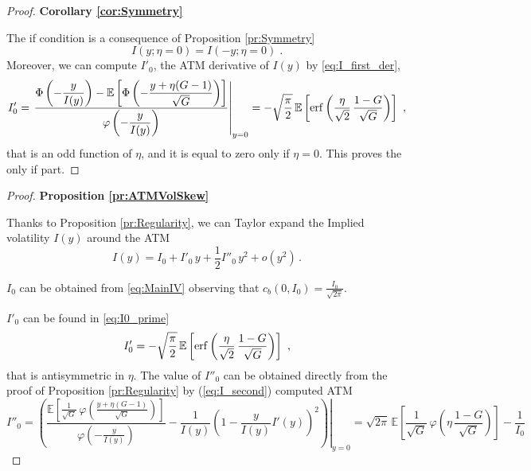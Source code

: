 \documentclass[12pt]{article}
\theoremstyle{definition}
\theoremstyle{remark}
\numberwithin{theorem}{section}
\numberwithin{proposition}{section}
\numberwithin{lemma}{section}
\numberwithin{corollary}{section}
\numberwithin{definition}{section}
\numberwithin{remark}{section}
\numberwithin{example}{section}
\newcommand{\E}{\mathbb{E}}
\begin{document}
\begin{proof} {\bf Corollary \ref{cor:Symmetry} }

The if condition is a consequence of Proposition \ref{pr:Symmetry}
\[
I(y; \eta=0) = I(- y; \eta=0) \; .
\]
Moreover, we can compute $I'_0$, the ATM derivative of $I(y)$ by \eqref{eq:I_first_der},
\begin{equation}
\label{eq:I0_prime} 
I'_0 = 
\displaystyle \left. \frac{\displaystyle \Phi\left( - \frac{y}{I(y)} \right) - \E \left[ \Phi\left( - \frac{y+\eta(G-1)}{ \sqrt{G}} \right) \right] }
{\displaystyle \varphi\left(-\frac{y}{I(y)}\right)} \right|_{y=0} 
 = -\sqrt{\frac{\pi}{2}}\, \E \left[ {\rm erf} \left( \frac{ {\eta}}{\sqrt{2}} \, \frac{  1 - G }{  \sqrt{G}} \right) \right]\,\,,
\end{equation}
that is an odd function of $\eta$, and it is equal to zero only if $\eta =0$. This proves the only if part.
\end{proof}

\smallskip

\begin{proof} {\bf Proposition \ref{pr:ATMVolSkew} }

Thanks to Proposition \ref{pr:Regularity}, we can Taylor expand the Implied volatility $I(y)$ around the ATM 
\[
{I}(y) = {I}_0 +  I'_0 \, y + \frac{1}{2} I''_0 \, y^2 + o(y^2)\,.
\]

$I_0$ can be obtained from \eqref{eq:MainIV}
observing that $c_b(0, I_0) = \displaystyle\frac{I_0}{\sqrt{2 \pi}}$.

\smallskip

$I'_0$ can be found in \eqref{eq:I0_prime}
\begin{equation*}
I'_0 = -\sqrt{\frac{\pi}{2}}\, \E \left[ {\rm erf} \left( \frac{ {\eta}}{\sqrt{2}} \, \frac{  1 - G }{  \sqrt{G}} \right) \right]\,\,,
\end{equation*}
that is antisymmetric in $\eta$. 
The value of $I''_0$ can be obtained directly 
from the proof of Proposition \ref{pr:Regularity} by (\ref{eq:I_second}) computed ATM
\begin{equation*}
{ I}''_0  =\displaystyle \left. \left(\displaystyle\frac{\mathbb{E}\left[\frac{1}{\sqrt{G}} \, \varphi\left(\frac{y+\eta(G-1)}{\sqrt{G}}\right)\right]}{\varphi\left(-\frac{y}{I(y)}\right)}
     -\frac{1}{I(y)}\left(1-\frac{y}{I(y)}I'(y)\right)^2 \right)\right|_{y=0}= \displaystyle \sqrt{2 \pi}\,\displaystyle 
 \E \left[ \frac{1}{  \sqrt{G}} \, \varphi \left(  {\eta} \, \frac{  1 - G }{  \sqrt{G}} \right) \right] - \frac{1}{I_0}
\end{equation*}
\end{proof}
\end{document}
